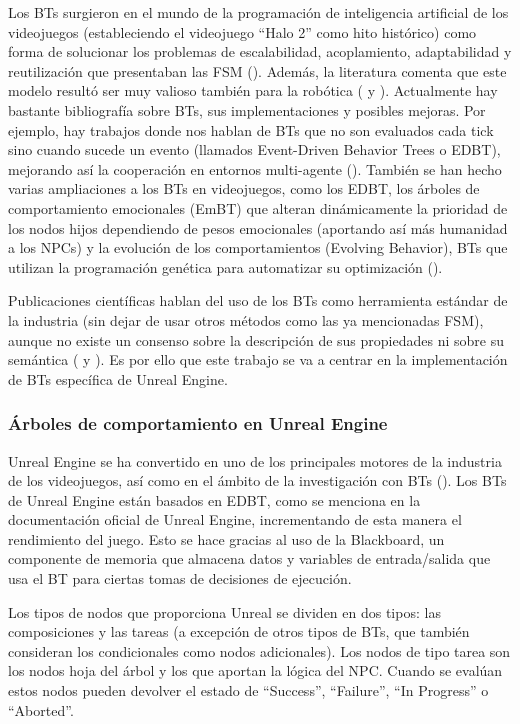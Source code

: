 Los BTs surgieron en el mundo de la programación de inteligencia artificial de los videojuegos (estableciendo el videojuego ``Halo 2'' como hito histórico) como forma de solucionar los problemas de escalabilidad, acoplamiento, adaptabilidad y reutilización que presentaban las FSM (\cite{BTOg}).
Además, la literatura comenta que este modelo resultó ser muy valioso también para la robótica (\cite{BTRev} y \cite{BTRob}).
Actualmente hay bastante bibliografía sobre BTs, sus implementaciones y posibles mejoras.
Por ejemplo, hay trabajos donde nos hablan de BTs que no son evaluados cada tick sino cuando sucede un evento (llamados Event-Driven Behavior Trees o EDBT), mejorando así la cooperación en entornos multi-agente (\cite{EDBT}).
También se han hecho varias ampliaciones a los BTs en videojuegos, como los EDBT, los árboles de comportamiento emocionales (EmBT) que alteran dinámicamente la prioridad de los nodos hijos dependiendo de pesos emocionales (aportando así más humanidad a los NPCs) y la evolución de los comportamientos (Evolving Behavior), BTs que utilizan la programación genética para automatizar su optimización (\cite{BTVarios}).

Publicaciones científicas hablan del uso de los BTs como herramienta estándar de la industria (sin dejar de usar otros métodos como las ya mencionadas FSM), aunque no existe un consenso sobre la descripción de sus propiedades ni sobre su semántica (\cite{BTEstandar} y \cite{BTEval}).
Es por ello que este trabajo se va a centrar en la implementación de BTs específica de Unreal Engine.

\subsubsection{Árboles de comportamiento en Unreal Engine}
Unreal Engine se ha convertido en uno de los principales motores de la industria de los videojuegos, así como en el ámbito de la investigación con BTs (\cite{BTUE4}).
Los BTs de Unreal Engine están basados en EDBT, como se menciona en la documentación oficial de Unreal Engine\footnotemark, incrementando de esta manera el rendimiento del juego.
Esto se hace gracias al uso de la Blackboard, un componente de memoria que almacena datos y variables de entrada/salida que usa el BT para ciertas tomas de decisiones de ejecución.

Los tipos de nodos que proporciona Unreal se dividen en dos tipos: las composiciones y las tareas (a excepción de otros tipos de BTs, que también consideran los condicionales como nodos adicionales).
Los nodos de tipo tarea son los nodos hoja del árbol y los que aportan la lógica del NPC.
Cuando se evalúan estos nodos pueden devolver el estado de ``Success'', ``Failure'', ``In Progress'' o ``Aborted''.

